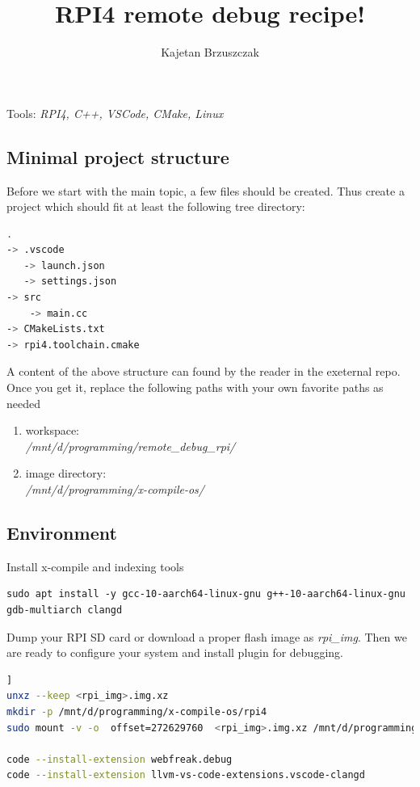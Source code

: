 \documentclass[twocolumn, 10pt]{article}
\title{RPI4 remote debug recipe!}
\author{Kajetan Brzuszczak}
\makeatletter
\renewcommand{\maketitle}{
\begin{flushleft}
{\noindent\Huge\bf\@title}\break
\end{flushleft}
}
\makeatother
\begin{document}
\maketitle

Tools: \textit{RPI4, C++, VSCode, CMake, Linux}

\subsection*{Minimal project structure}
\normalsize

Before we start with the main topic, a few files should be created.
Thus create a project which should fit at least the following tree directory:
\begin{lstlisting}[language=sh,caption={},backgroundcolor=\color{gray!10}]
.
-> .vscode
   -> launch.json
   -> settings.json
-> src
    -> main.cc
-> CMakeLists.txt
-> rpi4.toolchain.cmake
\end{lstlisting}

A content of the above structure can found by the reader in the exeternal repo\cite{bib:example}.
Once you get it, replace the following paths with your own favorite paths as needed
\begin{enumerate}
  \item workspace: \\
        \textit{/mnt/d/programming/remote\_debug\_rpi/}
  \item image directory: \\
        \textit{/mnt/d/programming/x-compile-os/}
\end{enumerate}

\subsection*{Environment}
Install x-compile and indexing tools
\begin{lstlisting}[backgroundcolor=\color{gray!10},caption={}]
sudo apt install -y gcc-10-aarch64-linux-gnu g++-10-aarch64-linux-gnu gdb-multiarch clangd
\end{lstlisting}

Dump your RPI SD card or download a proper flash image\cite{bib:rpi-images} as \textit{rpi\_img}.
Then we are ready to configure your system and install plugin for debugging.

\begin{lstlisting}[language=sh,backgroundcolor=\color{gray!10},breaklines=true,escapechar=|,caption={}]]
unxz --keep <rpi_img>.img.xz
mkdir -p /mnt/d/programming/x-compile-os/rpi4
sudo mount -v -o  offset=272629760  <rpi_img>.img.xz /mnt/d/programming/x-compile-os/rpi4

code --install-extension webfreak.debug
code --install-extension llvm-vs-code-extensions.vscode-clangd
\end{lstlisting}
\end{document}
